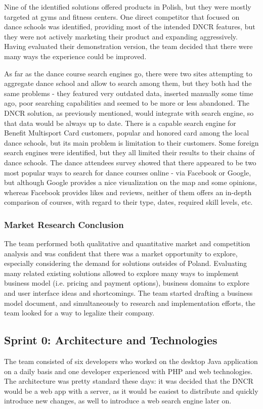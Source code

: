 \documentclass{article}
\begin{document}
Nine of the identified solutions offered products in Polish, but they were mostly targeted at gyms and fitness centers. One direct competitor that focused on dance schools was identified, providing most of the intended DNCR features, but they were not actively marketing their product and expanding aggressively. Having evaluated their demonstration version, the team decided that there were many ways the experience could be improved.

As far as the dance course search engines go, there were two sites attempting to aggregate dance school and allow to search among them, but they both had the same problems - they featured very outdated data, inserted manually some time ago, poor searching capabilities and seemed to be more or less abandoned. The DNCR solution, as previously mentioned, would integrate with search engine, so that data would be always up to date. There is a capable search engine for Benefit Multisport Card customers, popular and honored card among the local dance schools, but its main problem is limitation to their customers. Some foreign search engines were identified, but they all limited their results to their chains of dance schools. The dance attendees survey showed that there appeared to be two most popular ways to search for dance courses online - via Facebook or Google, but although Google provides a nice visualization on the map and some opinions, whereas Facebook provides likes and reviews, neither of them offers an in-depth comparison of courses, with regard to their type, dates, required skill levels, etc.

\subsubsection{Market Research Conclusion}
The team performed both qualitative and quantitative market and competition analysis and was confident that there was a market opportunity to explore, especially considering the demand for solutions outsides of Poland. Evaluating many related existing solutions allowed to explore many ways to implement business model (i.e. pricing and payment options), business domains to explore and user interface ideas and shortcomings. The team started drafting a business model document, and simultaneously to research and implementation efforts, the team looked for a way to legalize their company.

\subsection{Sprint 0: Architecture and Technologies}
The team consisted of six developers who worked on the desktop Java application on a daily basis and one developer experienced with PHP and web technologies. The architecture was pretty standard these days: it was decided that the DNCR would be a web app with a server, as it would be easiest to distribute and quickly introduce new changes, as well to introduce a web search engine later on.
\end{document}
